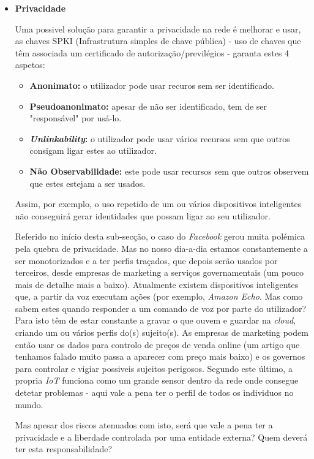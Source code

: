 \documentclass{llncs}
\begin{document}
\begin{itemize}
    \item \textbf{Privacidade}
        
        Uma possivel solução para garantir a privacidade na rede é melhorar e usar, as chaves SPKI (Infrastrutura simples de chave pública) - uso de chaves que têm associada um certificado de autorização/previlégios - garanta estes 4 aspetos: \cite{Fink}
            \begin{itemize}
                \item \textbf{Anonimato:} o utilizador pode usar recuros sem ser identificado.
                \item \textbf{Pseudoanonimato:} apesar de não ser identificado, tem de ser "responsável" por usá-lo.
                \item \textbf{\textit{Unlinkability}:} o utilizador pode usar vários recursos sem que outros consigam ligar estes ao utilizador.
                \item \textbf{Não Observabilidade:} este pode usar recursos sem que outros observem que estes estejam a ser usados.
            \end{itemize}
        Assim, por exemplo, o uso repetido de um ou vários dispositivos inteligentes não conseguirá gerar identidades que possam ligar ao seu utilizador.\par
        
        Referido no início desta sub-secção, o caso do \textit{Facebook} gerou muita polémica pela quebra de privacidade. Mas no nosso dia-a-dia estamos constantemente a ser monotorizados e a ter perfis traçados, que depois serão usados por terceiros, desde empresas de marketing a serviços governamentais\cite{Fink} (um pouco mais de detalhe mais a baixo).
        Atualmente existem dispositivos inteligentes que, a partir da voz executam ações (por exemplo, \textit{Amazon Echo}. Mas como sabem estes quando responder a um comando de voz por parte do utilizador? Para isto têm de estar constante a gravar o que ouvem e guardar na \textit{cloud}, criando um ou vários perfis do(s) sujeito(s). As empresas de marketing podem então usar os dados para controlo de preços de venda online (um artigo que tenhamos falado muito passa a aparecer com preço mais baixo) e os governos para controlar e vigiar possiveis sujeitos perigosos.
        Segundo este último, a propria \textit{IoT} funciona como um grande sensor dentro da rede onde consegue detetar problemas - aqui vale a pena ter o perfil de todos os individuos no mundo.\par
        Mas apesar dos riscos atenuados com isto, será que vale a pena ter a privacidade e a liberdade controlada por uma entidade externa? Quem deverá ter esta responsabilidade? 

\end{itemize}
\end{document}
